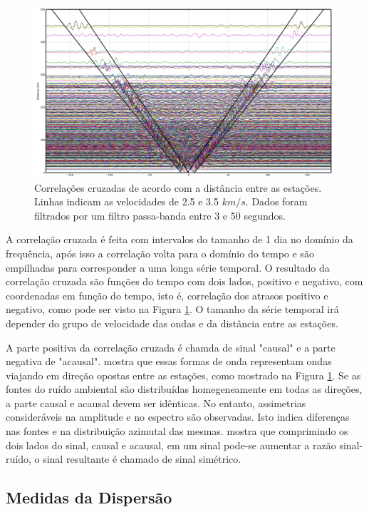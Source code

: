 \begin{figure}[!ht]
\centering
\includegraphics[scale=0.11]{correlaca_cruzada.png}
\caption{Correlações cruzadas de acordo com a distância entre as estações. Linhas indicam as velocidades de 2.5 e 3.5 $km/s$. Dados foram filtrados por um filtro passa-banda entre 3 e 50 segundos.}
\label{correlacao_cruzada}
\end{figure} 

A correlação cruzada é feita com intervalos do tamanho de 1 dia no domínio da frequência, após isso a correlação volta para o domínio do tempo e são empilhadas para corresponder a uma longa série temporal. 
O resultado da correlação cruzada são funções do tempo com dois lados, positivo e negativo, com coordenadas em função do tempo, isto é, correlação dos atrasos positivo e negativo, como pode ser visto na Figura \ref{correlacao_cruzada}. O tamanho da série temporal irá depender do grupo de velocidade das ondas e da distância entre as estações.

A parte positiva da correlação cruzada é chamda de sinal "causal" e a parte negativa de "acausal". \cite{bensen_processing_2007} mostra que essas formas de onda representam ondas viajando em direção opostas entre as estações, como mostrado na Figura \ref{correlacao_cruzada}. Se as fontes do ruído ambiental são distribuídas homegeneamente em todas as direções, a parte  causal e acausal devem ser idênticas. No entanto, assimetrias consideráveis na amplitude e no espectro são observadas. Isto indica diferenças nas fontes e na distribuição azimutal das mesmas. \cite{bensen_processing_2007} mostra que comprimindo os dois lados do sinal, causal e acausal, em um sinal pode-se aumentar a razão sinal-ruído, o sinal resultante é chamado de sinal simétrico.

\subsection{Medidas da Dispersão}


